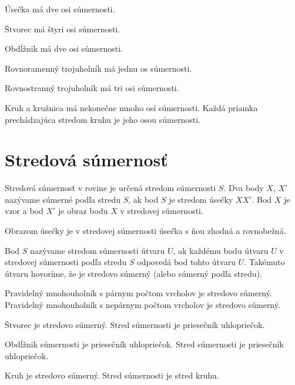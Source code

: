 \documentclass{article}
\begin{document}
Úsečka má dve osi súmernosti.

Štvorec má štyri osi súmernosti.

Obdĺžnik má dve osi súmernosti.

Rovnoramenný trojuholník má jednu os súmernosti.

Rovnostranný trojuholník má tri osi súmernosti.

Kruh a kružnica má nekonečne mnoho osí súmernosti. Každá priamka prechádzajúca stredom kruhu je jeho osou súmernosti.

\section{Stredová súmernosť}

Stredová súmernosť v rovine je určená stredom súmernosti \(S\). Dva body \(X\), \(X'\) nazývame súmerné podľa stredu \(S\), ak bod \(S\) je stredom úsečky \(XX'\). Bod \(X\) je vzor a bod \(X'\) je obraz bodu \(X\) v stredovej súmernosti.

Obrazom úsečky je v stredovej súmernosti úsečka s ňou zhodná a rovnobežná.

Bod \(S\) nazývame stredom súmernosti útvaru \(U\), ak každému bodu útvaru \(U\) v stredovej súmernosti podľa stredu \(S\) odpovedá bod tohto útvaru \(U\). Takémuto útvaru hovoríme, že je stredovo súmerný (alebo súmerný podľa stredu).

Pravidelný mnohouholník s párnym počtom vrcholov je stredovo súmerný.
Pravidelný mnohouholník s nepárnym počtom vrcholov je stredovo súmerný.

Štvorec je stredovo súmerný. Stred súmernosti je priesečník uhlopriečok.

Obdĺžnik súmernosti je priesečník uhlopriečok. Stred súmernosti je priesečník uhlopriečok.

Kruh je stredovo súmerný. Stred súmernosti je stred kruhu.
\end{document}
